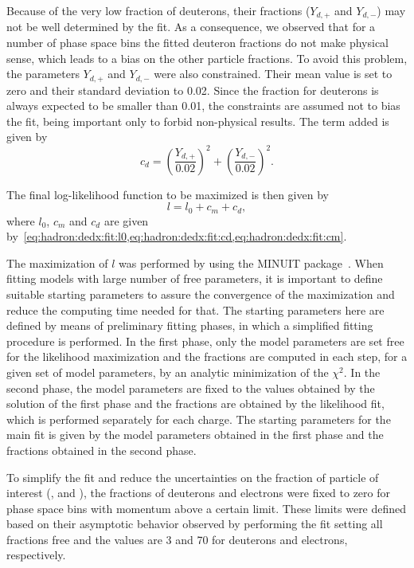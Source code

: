 Because of the very low fraction of deuterons,
their fractions ($Y_{d,+}$ and $Y_{d,-}$)
may not be well determined by the fit. As a consequence, we
observed that for a number of phase space bins the fitted deuteron
fractions do not make physical sense, which leads to a bias
on the other particle fractions. To avoid this problem,
the parameters $Y_{d,+}$ and $Y_{d,-}$ were also
constrained. Their mean value is set
to zero and their standard deviation to 0.02.
Since the fraction for deuterons is always expected
to be smaller than 0.01, the constraints
are assumed not to bias the fit, being important
only to forbid non-physical results. The term added
is given by
\begin{equation}
  c_d = \left(\frac{Y_{d,+}}{0.02}\right)^2+\left(\frac{Y_{d,-}}{0.02}\right)^2.
  \label{eq:hadron:dedx:fit:cd}
\end{equation}

The final log-likelihood function to be maximized is then
given by
\begin{equation}
  l = l_0+c_m+c_d,
  \label{eq:hadron:dedx:fit:l}
\end{equation}
where $l_0$, $c_m$ and $c_d$ are given
by~\cref{eq:hadron:dedx:fit:l0,eq:hadron:dedx:fit:cd,eq:hadron:dedx:fit:cm}.

The maximization of $l$
was performed by using the MINUIT package~\cite{James:1975dr}.
When fitting models with large number of free parameters,
it is important to define suitable starting parameters
to assure the convergence of the maximization and
reduce the computing time needed for that.
The starting parameters here are defined by means of
preliminary fitting phases, in which a simplified fitting
procedure is performed. In the first phase, only the model
parameters are set free for the likelihood maximization
and the fractions are computed in each step,
for a given set of model parameters, by an
analytic minimization of the $\chi^2$.
In the second phase, the model parameters are fixed
to the values obtained by the solution of the first phase
and the fractions are obtained by the likelihood fit,
which is performed separately for each charge.
The starting parameters for the main fit is given by
the model parameters obtained in the first phase and the
fractions obtained in the second phase.

To simplify the fit and reduce the uncertainties on the
fraction of particle of interest (\pions, \kaons and \protons),
the fractions of deuterons and electrons were fixed to zero
for phase space bins with momentum above a certain limit. These limits were
defined based on their asymptotic behavior observed by performing
the fit setting all fractions free and the values are 3 and 70 \GeVc
for deuterons and electrons, respectively. 

